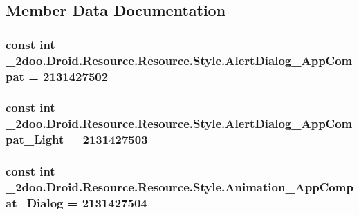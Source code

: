 \subsection{Member Data Documentation}
\hypertarget{class__2doo_1_1_droid_1_1_resource_1_1_style_7bc4e769e370fe3e5e79317e5a3d7b7b}{
\subsubsection[{AlertDialog\_\-AppCompat}]{\setlength{\rightskip}{0pt plus 5cm}const int \_\-2doo.Droid.Resource.Resource.Style.AlertDialog\_\-AppCompat = 2131427502}}
\label{class__2doo_1_1_droid_1_1_resource_1_1_style_7bc4e769e370fe3e5e79317e5a3d7b7b}


\hypertarget{class__2doo_1_1_droid_1_1_resource_1_1_style_987bfa2a012910203ad8f4d8f86e1748}{
\subsubsection[{AlertDialog\_\-AppCompat\_\-Light}]{\setlength{\rightskip}{0pt plus 5cm}const int \_\-2doo.Droid.Resource.Resource.Style.AlertDialog\_\-AppCompat\_\-Light = 2131427503}}
\label{class__2doo_1_1_droid_1_1_resource_1_1_style_987bfa2a012910203ad8f4d8f86e1748}


\hypertarget{class__2doo_1_1_droid_1_1_resource_1_1_style_2a40c711ea4abf02ed7ab6affdf51603}{
\subsubsection[{Animation\_\-AppCompat\_\-Dialog}]{\setlength{\rightskip}{0pt plus 5cm}const int \_\-2doo.Droid.Resource.Resource.Style.Animation\_\-AppCompat\_\-Dialog = 2131427504}}
\label{class__2doo_1_1_droid_1_1_resource_1_1_style_2a40c711ea4abf02ed7ab6affdf51603}



